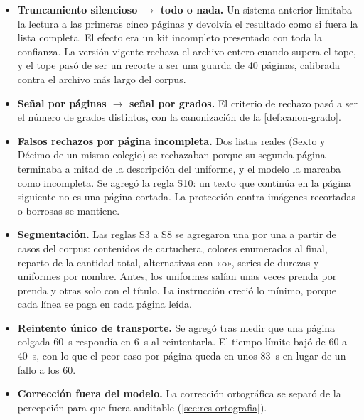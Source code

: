 \begin{evolucion}[: percepción]
\begin{itemize}
  \item \textbf{Truncamiento silencioso $\to$ todo o nada.} Un sistema
        anterior limitaba la lectura a las primeras cinco páginas y devolvía el
        resultado como si fuera la lista completa. El efecto era un kit
        incompleto presentado con toda la confianza. La versión vigente
        rechaza el archivo entero cuando supera el tope, y el tope pasó de
        ser un recorte a ser una guarda de 40 páginas, calibrada contra el
        archivo más largo del corpus.
  \item \textbf{Señal por páginas $\to$ señal por grados.} El criterio de
        rechazo pasó a ser el número de grados distintos, con la canonización
        de la \cref{def:canon-grado}.
  \item \textbf{Falsos rechazos por página incompleta.} Dos listas reales
        (Sexto y Décimo de un mismo colegio) se rechazaban porque su segunda
        página terminaba a mitad de la descripción del uniforme, y el modelo
        la marcaba como incompleta. Se agregó la regla S10: un texto que
        continúa en la página siguiente no es una página cortada. La
        protección contra imágenes recortadas o borrosas se mantiene.
  \item \textbf{Segmentación.} Las reglas S3 a S8 se agregaron una por una a
        partir de casos del corpus: contenidos de cartuchera, colores
        enumerados al final, reparto de la cantidad total, alternativas con
        «o», series de durezas y uniformes por nombre. Antes, los uniformes
        salían unas veces prenda por prenda y otras solo con el título. La
        instrucción creció lo mínimo, porque cada línea se paga en cada página
        leída.
  \item \textbf{Reintento único de transporte.} Se agregó tras medir que una
        página colgada 60~s respondía en 6~s al reintentarla. El tiempo límite
        bajó de 60 a 40~s, con lo que el peor caso por página queda en unos
        83~s en lugar de un fallo a los 60.
  \item \textbf{Corrección fuera del modelo.} La corrección ortográfica se
        separó de la percepción para que fuera auditable
        (\cref{sec:res-ortografia}).
\end{itemize}
\end{evolucion}
